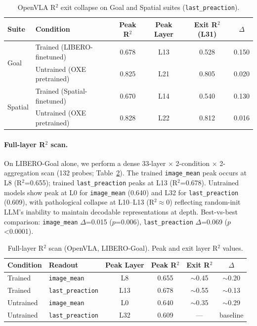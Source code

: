 \documentclass[letterpaper]{article}
\begin{document}
\begin{table}[t]
\centering
\caption{OpenVLA R$^2$ exit collapse on Goal and Spatial suites (\texttt{last\_preaction}).}
\label{tab:openvla-collapse}
\small
\begin{tabular}{llcccc}
\toprule
Suite & Condition & Peak R$^2$ & Peak Layer & Exit R$^2$ (L31) & $\Delta$ \\
\midrule
\multirow{2}{*}{Goal}    & Trained (LIBERO-finetuned) & 0.678 & L13 & 0.528 & 0.150 \\
                          & Untrained (OXE pretrained) & 0.825 & L21 & 0.805 & 0.020 \\
\midrule
\multirow{2}{*}{Spatial}  & Trained (Spatial-finetuned) & 0.670 & L14 & 0.540 & 0.130 \\
                          & Untrained (OXE pretrained) & 0.828 & L22 & 0.812 & 0.016 \\
\bottomrule
\end{tabular}
\end{table}

\paragraph{Full-layer R$^2$ scan.}
On LIBERO-Goal alone, we perform a dense 33-layer $\times$ 2-condition $\times$ 2-aggregation scan (132 probes; Table~\ref{tab:r2-full}).
The trained \texttt{image\_mean} peak occurs at L8 (R$^2$=0.655); trained \texttt{last\_preaction} peaks at L13 (R$^2$=0.678).
Untrained models show peak at L0 for \texttt{image\_mean} (0.640) and L32 for \texttt{last\_preaction} (0.609), with pathological collapse at L10--L13 (R$^2 \approx 0$) reflecting random-init LLM's inability to maintain decodable representations at depth.
Best-vs-best comparison: \texttt{image\_mean} $\Delta$=0.015 ($p$=0.006), \texttt{last\_preaction} $\Delta$=0.069 ($p$<0.0001).

\begin{table}[t]
\centering
\caption{Full-layer R$^2$ scan (OpenVLA, LIBERO-Goal). Peak and exit layer R$^2$ values.}
\label{tab:r2-full}
\small
\begin{tabular}{llcccc}
\toprule
Condition & Readout & Peak Layer & Peak R$^2$ & Exit R$^2$ & $\Delta$ \\
\midrule
Trained   & \texttt{image\_mean}       & L8  & 0.655 & $\sim$0.45 & $\sim$0.20 \\
Trained   & \texttt{last\_preaction}    & L13 & 0.678 & $\sim$0.55 & $\sim$0.13 \\
Untrained & \texttt{image\_mean}       & L0  & 0.640 & $\sim$0.35 & $\sim$0.29 \\
Untrained & \texttt{last\_preaction}    & L32 & 0.609 & ---        & baseline \\
\bottomrule
\end{tabular}
\end{table}
\end{document}
